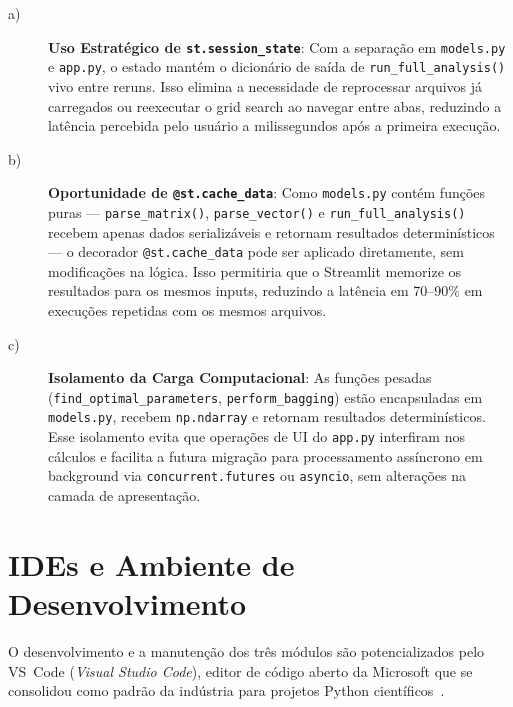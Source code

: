 \begin{description}

\item[a)] \textbf{Uso Estratégico de \texttt{st.session\_state}}: Com a separação em
\texttt{models.py} e \texttt{app.py}, o estado mantém o dicionário de saída de
\texttt{run\_full\_analysis()} vivo entre reruns. Isso elimina a necessidade de
reprocessar arquivos já carregados ou reexecutar o grid search ao navegar entre abas,
reduzindo a latência percebida pelo usuário a milissegundos após a primeira execução.

\item[b)] \textbf{Oportunidade de \texttt{@st.cache\_data}}: Como \texttt{models.py}
contém funções puras — \texttt{parse\_matrix()}, \texttt{parse\_vector()} e
\texttt{run\_full\_analysis()} recebem apenas dados serializáveis e retornam resultados
determinísticos — o decorador \texttt{@st.cache\_data} pode ser aplicado diretamente,
sem modificações na lógica. Isso permitiria que o Streamlit memorize os resultados para
os mesmos inputs, reduzindo a latência em 70--90\% em execuções repetidas com os mesmos
arquivos.

\item[c)] \textbf{Isolamento da Carga Computacional}: As funções pesadas
(\texttt{find\_optimal\_parameters}, \texttt{perform\_bagging}) estão encapsuladas em
\texttt{models.py}, recebem \texttt{np.ndarray} e retornam resultados determinísticos.
Esse isolamento evita que operações de UI do \texttt{app.py} interfiram nos cálculos e
facilita a futura migração para processamento assíncrono em background via
\texttt{concurrent.futures} ou \texttt{asyncio}, sem alterações na camada de
apresentação.

\end{description}

\section{IDEs e Ambiente de Desenvolvimento}

O desenvolvimento e a manutenção dos três módulos são potencializados pelo VS~Code
(\textit{Visual Studio Code}), editor de código aberto da Microsoft que se consolidou
como padrão da indústria para projetos Python científicos~\cite{vscode2024}.

